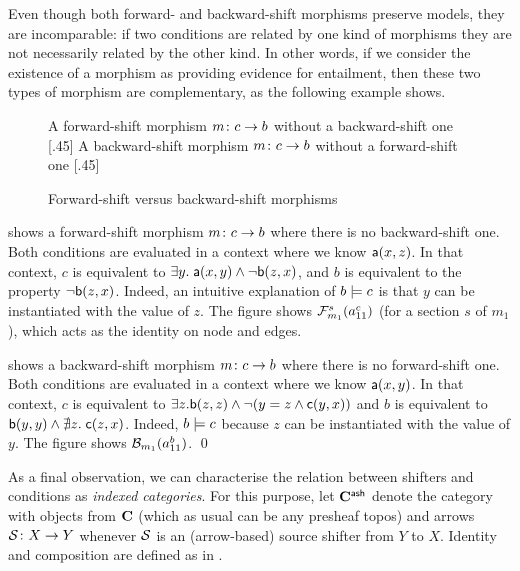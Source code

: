 \medskip\noindent
Even though both forward- and backward-shift morphisms preserve models, they are incomparable: if two conditions are related by one kind of morphisms they are not necessarily related by the other kind. In other words, if we consider the existence of a morphism as providing evidence for entailment, then these two types of morphism are complementary, as the following example shows.
%
\begin{figure}[t]
\centering
\subcaptionbox
  {A forward-shift morphism $m \colon c \rightarrow b$ without a backward-shift one
  }
  [.45\textwidth]
  {}
  \qquad
\subcaptionbox
  {A backward-shift morphism $m \colon c \rightarrow b$ without a forward-shift one
  }
  [.45\textwidth]
  {}
\caption{Forward-shift versus backward-shift morphisms}
\end{figure}
%
\begin{example}
 shows a forward-shift morphism $m \colon c \rightarrow b$ where there is no backward-shift one. Both conditions are evaluated in a context where we know $\mathsf{a}(x,z)$. In that context,  $c$ is equivalent to $\exists y.\; \mathsf{a}(x,y) \wedge \neg \mathsf{b}(z,x)$, and $b$ is equivalent to the property $\neg \mathsf{b}(z,x)$. Indeed, an intuitive explanation of $b\models c$ is that $y$ can be instantiated with the value of $z$. The figure shows $\mathcal{F}_{m_1}^s(a^c_{11})$ (for a section $s$ of $m_1$), which acts as the identity on node and edges.

 shows a backward-shift morphism $m \colon c \rightarrow b$ where there is no forward-shift one. Both conditions are evaluated in a context where we know $\mathsf{a}(x,y)$. In that context, $c$ is equivalent to $\exists z.\mathsf{b}(z,z) \wedge \neg(y=z \wedge \mathsf{c}(y,x))$ and $b$ is equivalent to $\mathsf{b}(y,y) \wedge \nexists z.\; \mathsf{c}(z,x)$.
Indeed, $b\models c$ because $z$ can be instantiated with the value of $y$. The figure shows $\mathcal{B}_{m_1}(a^b_{11})$.
\qed
\end{example}
%
As a final observation, we can characterise the relation between shifters and conditions as \emph{indexed categories}. For this purpose, let $\mathbf{C}^{\mathsf{ash}}$ denote the category with objects from $\mathbf{C}$ (which as usual can be any presheaf topos) and arrows $\mathcal{S}\colon X\rightarrow Y$ whenever $\mathcal{S}$ is an (arrow-based) source shifter from $Y$ to $X$. Identity and composition are defined as in .

